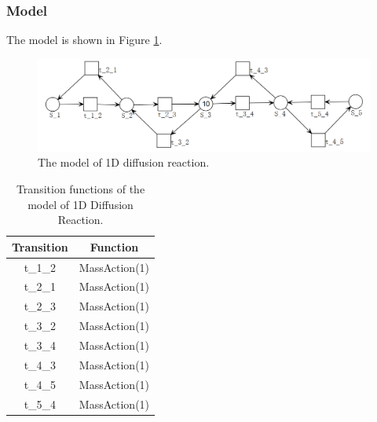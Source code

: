 \documentclass[journal,a4paper,onecolumn]{article}
\begin{document}
\subsubsection{Model}
The model is shown in Figure \ref{fig:The model of 1D diffusion reaction}.
\begin{figure}[!hbt]
	\begin{center}
		\includegraphics[width=\columnwidth]{fig20}
		\caption{The model of 1D diffusion reaction.}
		\label{fig:The model of 1D diffusion reaction}
	\end{center}
\end{figure}

\begin{table}[!hbt]
	\begin{center}
		\caption{Transition functions of the model of 1D Diffusion Reaction.}
		\label{Transition functions of 1D Diffusion Reaction}
		\begin{tabular}{|c|c|}
			\hline
			Transition&Function\\
			\hline
			t\_1\_2&MassAction(1)\\
			\hline
						t\_2\_1&MassAction(1)\\
			\hline
						t\_2\_3&MassAction(1)\\
			\hline
						t\_3\_2&MassAction(1)\\
			\hline
						t\_3\_4&MassAction(1)\\
			\hline
						t\_4\_3&MassAction(1)\\
			\hline
						t\_4\_5&MassAction(1)\\
			\hline
						t\_5\_4&MassAction(1)\\
			\hline
		\end{tabular}
	\end{center}
\end{table}
\end{document}
